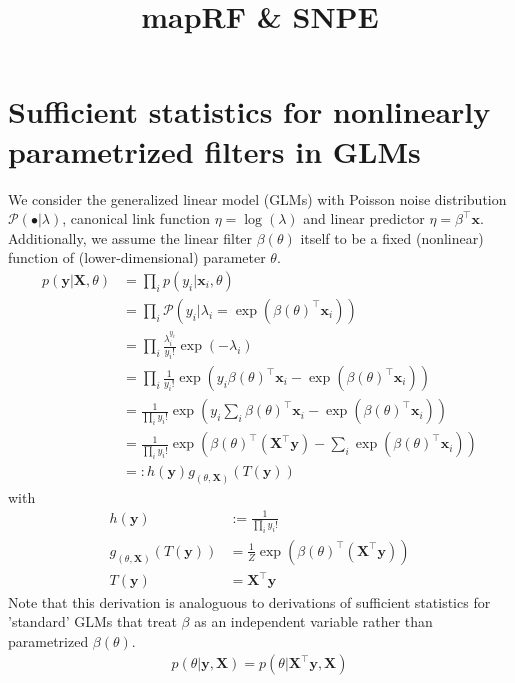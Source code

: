 \documentclass[10pt,english]{article}
\title{mapRF \& SNPE}
\author{}
\date{}
\newcommand{\yb}{\mathbf{y}}
\newcommand{\xb}{\mathbf{x}}
\newcommand{\Xb}{\mathbf{X}}
\begin{document}
\maketitle

\section{Sufficient statistics for nonlinearly parametrized filters in GLMs}
\label{seq:sufficiency_STA}

We consider the generalized linear model (GLMs) with Poisson noise distribution $\mathcal{P}(\bullet|\lambda)$, canonical link function $\eta= \log(\lambda)$ and linear predictor $\eta = \beta^\top \xb$. 
Additionally, we assume the linear filter $\beta(\theta)$ itself to be a fixed (nonlinear) function of (lower-dimensional) parameter $\theta$. 
\begin{align}
p(\yb | \Xb, \theta) &= \prod_i p(y_i | \xb_i, \theta) \nonumber \\
&= \prod_i \mathcal{P}\left(y_i | \lambda_i = \exp(\beta(\theta)^\top \xb_i) \right) \nonumber \\
&= \prod_i  \frac{\lambda_i^{y_i}}{y_i!} \exp(-\lambda_i) \nonumber \\
&= \prod_i \frac{1}{y_i!} \exp\left( y_i \beta(\theta)^\top \xb_i - \exp(\beta(\theta)^\top \xb_i) \right) \nonumber \\
&= \frac{1}{\prod_i y_i!} \exp\left( y_i \sum_i \beta(\theta)^\top \xb_i - \exp(\beta(\theta)^\top \xb_i) \right) \nonumber \\
&= \frac{1}{\prod_i y_i!} \exp\left( \beta(\theta)^\top \left(\Xb^\top \yb \right) - \sum_i  \exp(\beta(\theta)^\top \xb_i) \right) \nonumber \\
&=: h(\yb) g_{(\theta, \Xb)}(T(\yb)) \nonumber
\end{align}
with 
\begin{align}
h(\yb) &:= \frac{1}{\prod_i y_i!} \nonumber \\
g_{(\theta, \Xb)}(T(\yb)) &= \frac{1}{Z} \exp\left( \beta(\theta)^\top \left(\Xb^\top \yb \right) \right) \nonumber \\
T(\yb) &= \Xb^\top \yb \nonumber 
\end{align}
Note that this derivation is analoguous to derivations of sufficient statistics for 'standard' GLMs that treat $\beta$ as an independent variable rather than parametrized $\beta(\theta)$.
\begin{align}
p(\theta | \yb, \Xb) = p(\theta | \Xb^\top\yb, \Xb)
\end{align}
\end{document}
